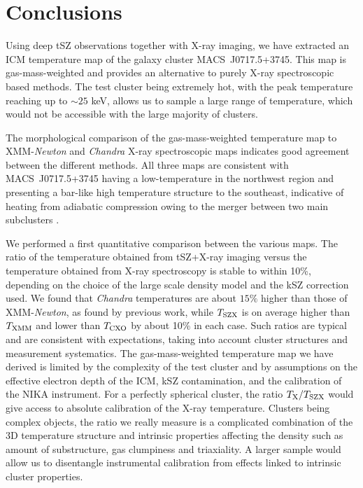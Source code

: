 \documentclass[twocolumn,traditabstract]{aa}
\def\TSZ {T_{\rm SZX}}
\def \TXC {T_{\rm CXO}}
\def \TXX {T_{\rm XMM}}
\begin{document}
\section{Conclusions}\label{sec:conclusions}
Using deep tSZ observations together with X-ray imaging, we have extracted an ICM temperature map of the galaxy cluster \mbox{MACS~J0717.5+3745}. This map is gas-mass-weighted and provides an alternative to purely X-ray spectroscopic based methods. The test cluster being extremely hot, with the peak temperature reaching up to $\sim 25$ keV, allows us to sample a large range of temperature, which would not be accessible with the large majority of clusters.

The morphological comparison of the gas-mass-weighted temperature map to XMM-\textit{Newton} and \textit{Chandra} X-ray spectroscopic maps indicates good agreement between the different methods. All three maps are consistent with \mbox{MACS~J0717.5+3745} having a low-temperature in the northwest region and presenting a bar-like high temperature structure to the southeast, indicative of heating from adiabatic compression owing to the merger between two main subclusters \citep[see, e.g.,][]{Ma2009}.

We performed a first quantitative comparison between the various maps. The ratio of the temperature obtained from tSZ+X-ray imaging versus the temperature obtained from X-ray spectroscopy is stable to within 10\%, depending on the choice of the large scale density model and the kSZ correction used. We found that \textit{Chandra} temperatures are about $15\%$ higher than those of XMM-\textit{Newton}, as found by previous work, while $\TSZ$ is on average higher than $\TXX$ and lower than $\TXC$ by about 10\% in each case. Such ratios are typical and are consistent with expectations, taking into account cluster structures and measurement systematics. The gas-mass-weighted temperature map we have derived is limited by the complexity of the test cluster and by assumptions on the effective electron depth of the ICM, kSZ contamination, and the calibration of the NIKA instrument. For a perfectly spherical cluster, the ratio $T_{\rm X} / \TSZ$ would give access to absolute calibration of the X-ray temperature. Clusters being complex objects, the ratio we really measure is a complicated combination of the 3D temperature structure and intrinsic properties affecting the density such as amount of substructure, gas clumpiness and triaxiality. A larger sample would allow us to disentangle instrumental calibration from effects linked to intrinsic cluster properties.
\end{document}
